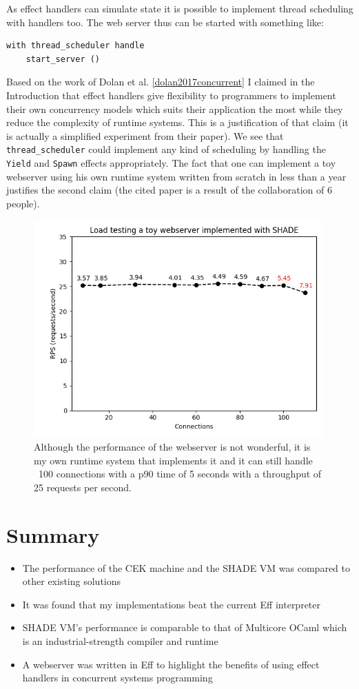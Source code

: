 \documentclass[class=article, crop=false]{standalone}
\begin{document}
As effect handlers can simulate state it is possible to implement thread scheduling with handlers too. The web server
thus can be started with something like:
\begin{verbatim}
with thread_scheduler handle
    start_server ()
\end{verbatim}
Based on the work of Dolan et al. \autoref{dolan2017concurrent} I claimed in the Introduction that effect handlers
give flexibility to programmers to implement their own concurrency models which suits their application the most
while they reduce the complexity of runtime systems. This is a justification of that claim (it is actually a
simplified experiment from their paper). We see that \verb|thread_scheduler| could implement any kind of scheduling
by handling the \verb|Yield| and \verb|Spawn| effects appropriately. The fact that one can implement a toy webserver
using his own runtime system written from scratch in less than a year justifies the second claim (the cited paper is
a result of the collaboration of 6 people).

\begin{figure}
    \centering
    \includegraphics[width=30em]{eval_plots/webserver.png}
    \caption{Although the performance of the webserver is not wonderful, it is my own runtime system that implements it and it can still handle ~100 connections with a p90 time of 5 seconds with a throughput of 25 requests per second.}
    \label{fig:hello-online-world}
\end{figure}

\section{Summary}

\begin{itemize}
    \item The performance of the CEK machine and the SHADE VM was compared to other existing solutions
    \item It was found that my implementations beat the current Eff interpreter
    \item SHADE VM's performance is comparable to that of Multicore OCaml which is an industrial-strength compiler and runtime
    \item A webserver was written in Eff to highlight the benefits of using effect handlers in concurrent systems programming
\end{itemize}
\end{document}

